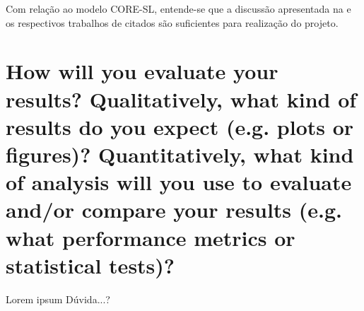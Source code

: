 Com relação ao modelo CORE-SL, entende-se que a discussão apresentada na  e os respectivos trabalhos de citados são suficientes para realização do projeto.


\section{How will you evaluate your results? Qualitatively, what kind of results do you expect (e.g. plots or figures)? Quantitatively, what kind of analysis will you use to evaluate and/or compare your results (e.g. what performance metrics or statistical tests)?}
Lorem ipsum
Dúvida...?


\printbibliography


